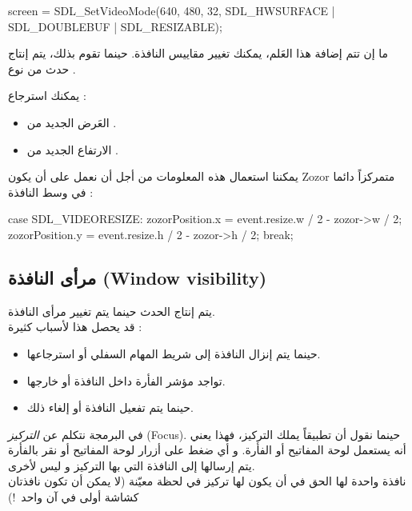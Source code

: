 \begin{Csource}
screen = SDL_SetVideoMode(640, 480, 32, SDL_HWSURFACE | SDL_DOUBLEBUF | SDL_RESIZABLE);
\end{Csource}

ما إن تتم إضافة هذا العَلم، يمكنك تغيير مقاييس النافذة. حينما تقوم بذلك، يتم إنتاج  حدث من نوع
.

يمكنك استرجاع :

\begin{itemize}
	\item العَرض الجديد من
	.
	\item الارتفاع الجديد من
	.
\end{itemize}

يمكننا استعمال هذه المعلومات من أجل أن نعمل على أن يكون
\textenglish{Zozor}
متمركزاً دائما في وسط النافذة :

\begin{Csource}
case SDL_VIDEORESIZE:
zozorPosition.x = event.resize.w / 2 - zozor->w / 2;
zozorPosition.y = event.resize.h / 2 - zozor->h / 2;
break;
\end{Csource}

\subsection{مرأى النافذة (\textenglish{Window visibility})}

يتم إنتاج الحدث
حينما يتم تغيير مرأى النافذة.\\
قد يحصل هذا لأسباب كثيرة :

\begin{itemize}
	\item حينما يتم إنزال النافذة إلى شريط المهام السفلي أو استرجاعها.
	\item تواجد مؤشر الفأرة داخل النافذة أو خارجها.
	\item حينما يتم تفعيل النافذة أو إلغاء ذلك.
\end{itemize}

\begin{information}
في البرمجة نتكلم عن
\textit{التركيز}
(\textenglish{Focus}).
حينما نقول أن تطبيقاً يملك التركيز، فهذا يعني أنه يستعمل لوحة المفاتيح أو الفأرة. و أي ضغط على أزرار لوحة المفاتيح أو نقر بالفأرة يتم إرسالها إلى النافذة التي بها التركيز و ليس لأخرى.\\
نافذة واحدة لها الحق في أن يكون لها تركيز في لحظة معيّنة (لا يمكن أن تكون نافذتان كشاشة أولى في آن واحد~!)
\end{information}

